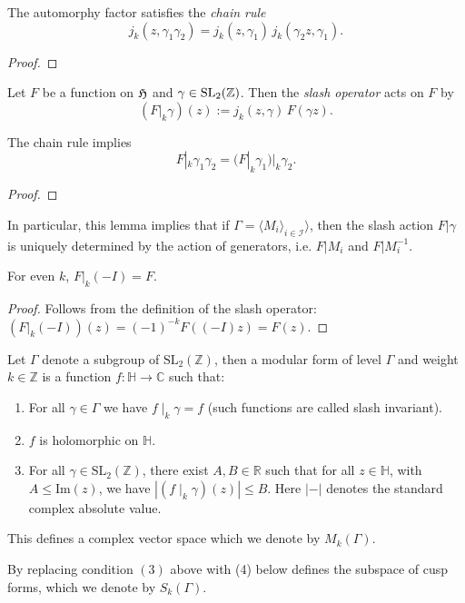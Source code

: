 \begin{lemma}\label{lemma:automorphy-factor-chain-rule}\leanok {}
    The automorphy factor satisfies the \emph{chain rule}
$$j_k(z,\gamma_1\gamma_2)=j_k(z,\gamma_1)\,j_k(\gamma_2z,\gamma_1). $$
\end{lemma}
\begin{proof}
    \leanok
\end{proof}

\begin{definition}\label{def:slash-operator}\leanok
    Let $F$ be a function on $\mathfrak{H}$ and $\gamma\in\mathrm{SL}_2(\mathbb{Z})$. Then the \emph{slash operator} acts on $F$ by
$$(F|_k\gamma)(z):=j_k(z,\gamma)\,F(\gamma z). $$
\end{definition}

\begin{lemma}\label{lemma:slash-operator-chain-rule}\leanok
  The chain rule implies $$F|_k\gamma_1\gamma_2=(F|_k\gamma_1)|_k\gamma_2.$$
\end{lemma}
\begin{proof}
    \leanok
\end{proof}

In particular, this lemma implies that if $\Gamma = \langle M_i \rangle_{i \in \mathcal{I}} \rangle$, then the slash action $F|\gamma$ is uniquely determined by the action of generators, i.e. $F|M_i$ and $F|M_i^{-1}$.

\begin{lemma}\label{lemma:slash-negI-even-weight}\leanok
   For even $k$, $F|_{k}(-I) = F$.
\end{lemma}
\begin{proof}
    \leanok
Follows from the definition of the slash operator:
$(F|_{k}(-I))(z) = (-1)^{-k}F((-I)z) = F(z)$.
\end{proof}

\begin{definition}\label{def:Mk}\leanok
	Let  $\Gamma$ denote a subgroup of $\mathrm{SL}_2(\mathbb{Z})$, then a modular form  of level $\Gamma$ and weight $k \in \mathbb{Z}$ is a function $f : \mathbb{H} \to \mathbb{C}$ such that:
	\begin{enumerate}
		\item For all $\gamma \in \Gamma$ we have $f\mid_k \gamma = f$  (such functions are called slash invariant).
		\item $f$ is holomorphic on $\mathbb{H}$.
		\item For all $\gamma \in \mathrm{SL}_2(\mathbb{Z})$, there exist $A, B \in \mathbb{R}$ such that for all $z \in \mathbb{H}$, with $ A \le \mathrm{Im}(z)$, we have $|(f \mid_k \gamma) (z) |\le B$. Here $| - |$ denotes the standard complex absolute value.
	\end{enumerate}
    This defines a complex vector space which we denote by $M_{k}(\Gamma)$.
\end{definition}
By replacing condition $(3)$ above with (4) below defines the subspace of cusp forms, which we denote by $S_k(\Gamma)$.


